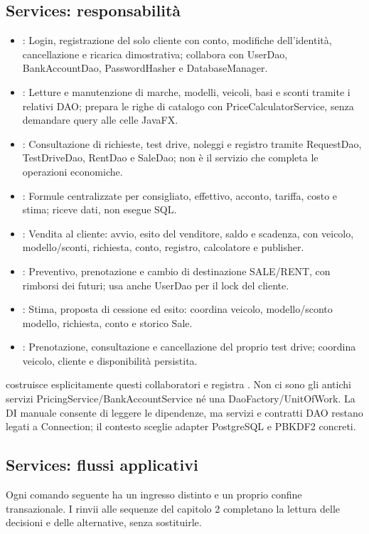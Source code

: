 {\raggedright
\subsection{Services: responsabilità}
\begin{itemize}
\item {}: Login, registrazione del solo cliente con conto,
modifiche dell'identità, cancellazione e ricarica dimostrativa; collabora
con UserDao, BankAccountDao, PasswordHasher e DatabaseManager.
\item {}: Letture e manutenzione di marche, modelli,
veicoli, basi e sconti tramite i relativi DAO; prepara le righe di catalogo
con PriceCalculatorService, senza demandare query alle celle JavaFX.
\item {}: Consultazione di richieste, test drive,
noleggi e registro tramite RequestDao, TestDriveDao, RentDao e SaleDao;
non è il servizio che completa le operazioni economiche.
\item {}: Formule centralizzate per consigliato,
effettivo, acconto, tariffa, costo e stima; riceve dati, non esegue SQL.
\item {}: Vendita al cliente: avvio, esito del venditore,
saldo e scadenza, con veicolo, modello/sconti, richiesta, conto, registro,
calcolatore e publisher.
\item {}: Preventivo, prenotazione e cambio di destinazione
SALE/RENT, con rimborsi dei futuri; usa anche UserDao per il lock del cliente.
\item {}: Stima, proposta di cessione ed esito:
coordina veicolo, modello/sconto modello, richiesta, conto e storico Sale.
\item {}: Prenotazione, consultazione e cancellazione
del proprio test drive; coordina veicolo, cliente e disponibilità persistita.
\end{itemize}
 costruisce esplicitamente questi collaboratori e registra
. Non ci sono gli antichi servizi
PricingService/BankAccountService né una DaoFactory/UnitOfWork.
La DI manuale consente di leggere le dipendenze, ma servizi e contratti
DAO restano legati a Connection; il contesto sceglie adapter PostgreSQL
e PBKDF2 concreti.\par}


\subsection{Services: flussi applicativi}\label{sec:impl-flussi}
Ogni comando seguente ha un ingresso distinto e un proprio confine
transazionale. I rinvii alle sequenze del capitolo 2 completano la lettura
delle decisioni e delle alternative, senza sostituirle.

